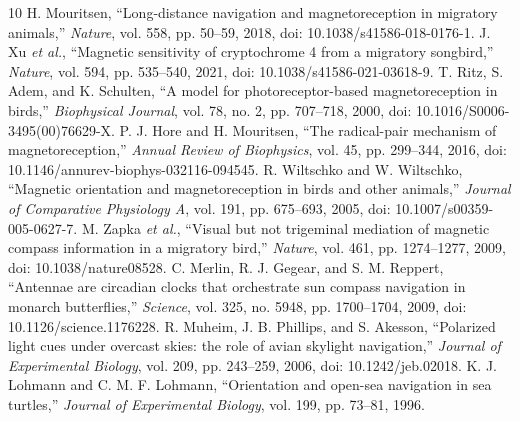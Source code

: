 \documentclass[conference]{IEEEtran}
\begin{document}
\newpage
\begin{thebibliography}{10}
H. Mouritsen, ``Long-distance navigation and magnetoreception in migratory animals,'' \emph{Nature}, vol. 558, pp. 50--59, 2018, doi: 10.1038/s41586-018-0176-1.
J. Xu \emph{et al.}, ``Magnetic sensitivity of cryptochrome 4 from a migratory songbird,'' \emph{Nature}, vol. 594, pp. 535--540, 2021, doi: 10.1038/s41586-021-03618-9.
T. Ritz, S. Adem, and K. Schulten, ``A model for photoreceptor-based magnetoreception in birds,'' \emph{Biophysical Journal}, vol. 78, no. 2, pp. 707--718, 2000, doi: 10.1016/S0006-3495(00)76629-X.
P. J. Hore and H. Mouritsen, ``The radical-pair mechanism of magnetoreception,'' \emph{Annual Review of Biophysics}, vol. 45, pp. 299--344, 2016, doi: 10.1146/annurev-biophys-032116-094545.
R. Wiltschko and W. Wiltschko, ``Magnetic orientation and magnetoreception in birds and other animals,'' \emph{Journal of Comparative Physiology A}, vol. 191, pp. 675--693, 2005, doi: 10.1007/s00359-005-0627-7.
M. Zapka \emph{et al.}, ``Visual but not trigeminal mediation of magnetic compass information in a migratory bird,'' \emph{Nature}, vol. 461, pp. 1274--1277, 2009, doi: 10.1038/nature08528.
C. Merlin, R. J. Gegear, and S. M. Reppert, ``Antennae are circadian clocks that orchestrate sun compass navigation in monarch butterflies,'' \emph{Science}, vol. 325, no. 5948, pp. 1700--1704, 2009, doi: 10.1126/science.1176228.
R. Muheim, J. B. Phillips, and S. Akesson, ``Polarized light cues under overcast skies: the role of avian skylight navigation,'' \emph{Journal of Experimental Biology}, vol. 209, pp. 243--259, 2006, doi: 10.1242/jeb.02018.
K. J. Lohmann and C. M. F. Lohmann, ``Orientation and open-sea navigation in sea turtles,'' \emph{Journal of Experimental Biology}, vol. 199, pp. 73--81, 1996.
\end{thebibliography}
\end{document}
